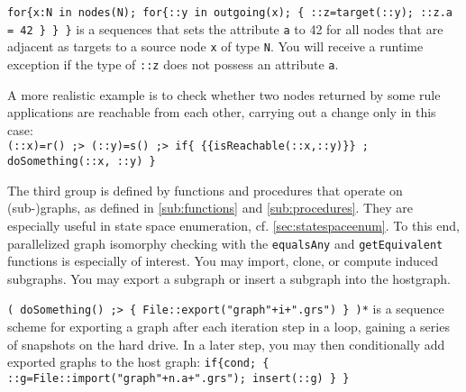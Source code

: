 \begin{example}
\verb#for{x:N in nodes(N); for{::y in outgoing(x); { ::z=target(::y); ::z.a = 42 } } }# 
is a sequences that sets the attribute \texttt{a} to 42 for all nodes that are adjacent as targets to a source node \texttt{x} of type \texttt{N}.
You will receive a runtime exception if the type of \verb#::z# does not possess an attribute \texttt{a}.

A more realistic example is to check whether two nodes returned by some rule applications are reachable from each other, carrying out a change only in this case:\\
\verb#(::x)=r() ;> (::y)=s() ;> if{ {{isReachable(::x,::y)}} ; doSomething(::x, ::y) }#
\end{example}

The third group is defined by functions and procedures that operate on (sub-)graphs, as defined in \ref{sub:functions} and \ref{sub:procedures}.
They are especially useful in state space enumeration, cf. \ref{sec:statespaceenum}.
To this end, parallelized graph isomorphy checking with the \texttt{equalsAny} and \texttt{getEquivalent} functions is especially of interest.
You may import, clone, or compute induced subgraphs.
You may export a subgraph or insert a subgraph into the hostgraph.

\begin{example}
\verb#( doSomething() ;> { File::export("graph"+i+".grs") } )*# is a sequence scheme for exporting a graph after each iteration step in a loop, gaining a series of snapshots on the hard drive.
In a later step, you may then conditionally add exported graphs to the host graph: 
\verb#if{cond; { ::g=File::import("graph"+n.a+".grs"); insert(::g) } }#
\end{example}

